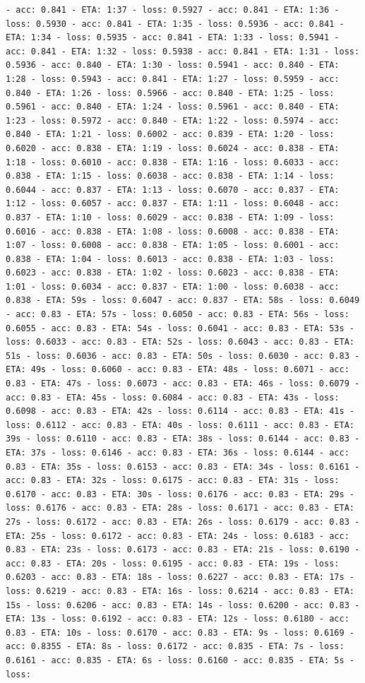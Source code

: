 \documentclass[11pt]{article}
\begin{document}
\begin{Verbatim}[commandchars=\\\{\}]
- acc: 0.841 - ETA: 1:37 - loss: 0.5927 - acc: 0.841 - ETA: 1:36 - loss: 0.5930 - acc: 0.841 - ETA: 1:35 - loss: 0.5936 - acc: 0.841 - ETA: 1:34 - loss: 0.5935 - acc: 0.841 - ETA: 1:33 - loss: 0.5941 - acc: 0.841 - ETA: 1:32 - loss: 0.5938 - acc: 0.841 - ETA: 1:31 - loss: 0.5936 - acc: 0.840 - ETA: 1:30 - loss: 0.5941 - acc: 0.840 - ETA: 1:28 - loss: 0.5943 - acc: 0.841 - ETA: 1:27 - loss: 0.5959 - acc: 0.840 - ETA: 1:26 - loss: 0.5966 - acc: 0.840 - ETA: 1:25 - loss: 0.5961 - acc: 0.840 - ETA: 1:24 - loss: 0.5961 - acc: 0.840 - ETA: 1:23 - loss: 0.5972 - acc: 0.840 - ETA: 1:22 - loss: 0.5974 - acc: 0.840 - ETA: 1:21 - loss: 0.6002 - acc: 0.839 - ETA: 1:20 - loss: 0.6020 - acc: 0.838 - ETA: 1:19 - loss: 0.6024 - acc: 0.838 - ETA: 1:18 - loss: 0.6010 - acc: 0.838 - ETA: 1:16 - loss: 0.6033 - acc: 0.838 - ETA: 1:15 - loss: 0.6038 - acc: 0.838 - ETA: 1:14 - loss: 0.6044 - acc: 0.837 - ETA: 1:13 - loss: 0.6070 - acc: 0.837 - ETA: 1:12 - loss: 0.6057 - acc: 0.837 - ETA: 1:11 - loss: 0.6048 - acc: 0.837 - ETA: 1:10 - loss: 0.6029 - acc: 0.838 - ETA: 1:09 - loss: 0.6016 - acc: 0.838 - ETA: 1:08 - loss: 0.6008 - acc: 0.838 - ETA: 1:07 - loss: 0.6008 - acc: 0.838 - ETA: 1:05 - loss: 0.6001 - acc: 0.838 - ETA: 1:04 - loss: 0.6013 - acc: 0.838 - ETA: 1:03 - loss: 0.6023 - acc: 0.838 - ETA: 1:02 - loss: 0.6023 - acc: 0.838 - ETA: 1:01 - loss: 0.6034 - acc: 0.837 - ETA: 1:00 - loss: 0.6038 - acc: 0.838 - ETA: 59s - loss: 0.6047 - acc: 0.837 - ETA: 58s - loss: 0.6049 - acc: 0.83 - ETA: 57s - loss: 0.6050 - acc: 0.83 - ETA: 56s - loss: 0.6055 - acc: 0.83 - ETA: 54s - loss: 0.6041 - acc: 0.83 - ETA: 53s - loss: 0.6033 - acc: 0.83 - ETA: 52s - loss: 0.6043 - acc: 0.83 - ETA: 51s - loss: 0.6036 - acc: 0.83 - ETA: 50s - loss: 0.6030 - acc: 0.83 - ETA: 49s - loss: 0.6060 - acc: 0.83 - ETA: 48s - loss: 0.6071 - acc: 0.83 - ETA: 47s - loss: 0.6073 - acc: 0.83 - ETA: 46s - loss: 0.6079 - acc: 0.83 - ETA: 45s - loss: 0.6084 - acc: 0.83 - ETA: 43s - loss: 0.6098 - acc: 0.83 - ETA: 42s - loss: 0.6114 - acc: 0.83 - ETA: 41s - loss: 0.6112 - acc: 0.83 - ETA: 40s - loss: 0.6111 - acc: 0.83 - ETA: 39s - loss: 0.6110 - acc: 0.83 - ETA: 38s - loss: 0.6144 - acc: 0.83 - ETA: 37s - loss: 0.6146 - acc: 0.83 - ETA: 36s - loss: 0.6144 - acc: 0.83 - ETA: 35s - loss: 0.6153 - acc: 0.83 - ETA: 34s - loss: 0.6161 - acc: 0.83 - ETA: 32s - loss: 0.6175 - acc: 0.83 - ETA: 31s - loss: 0.6170 - acc: 0.83 - ETA: 30s - loss: 0.6176 - acc: 0.83 - ETA: 29s - loss: 0.6176 - acc: 0.83 - ETA: 28s - loss: 0.6171 - acc: 0.83 - ETA: 27s - loss: 0.6172 - acc: 0.83 - ETA: 26s - loss: 0.6179 - acc: 0.83 - ETA: 25s - loss: 0.6172 - acc: 0.83 - ETA: 24s - loss: 0.6183 - acc: 0.83 - ETA: 23s - loss: 0.6173 - acc: 0.83 - ETA: 21s - loss: 0.6190 - acc: 0.83 - ETA: 20s - loss: 0.6195 - acc: 0.83 - ETA: 19s - loss: 0.6203 - acc: 0.83 - ETA: 18s - loss: 0.6227 - acc: 0.83 - ETA: 17s - loss: 0.6219 - acc: 0.83 - ETA: 16s - loss: 0.6214 - acc: 0.83 - ETA: 15s - loss: 0.6206 - acc: 0.83 - ETA: 14s - loss: 0.6200 - acc: 0.83 - ETA: 13s - loss: 0.6192 - acc: 0.83 - ETA: 12s - loss: 0.6180 - acc: 0.83 - ETA: 10s - loss: 0.6170 - acc: 0.83 - ETA: 9s - loss: 0.6169 - acc: 0.8355 - ETA: 8s - loss: 0.6172 - acc: 0.835 - ETA: 7s - loss: 0.6161 - acc: 0.835 - ETA: 6s - loss: 0.6160 - acc: 0.835 - ETA: 5s - loss: 
\end{Verbatim}
\end{document}
